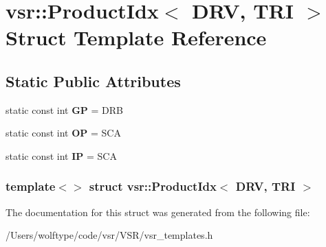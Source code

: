 \hypertarget{structvsr_1_1_product_idx_3_01_d_r_v_00_01_t_r_i_01_4}{\section{vsr\-:\-:Product\-Idx$<$ D\-R\-V, T\-R\-I $>$ Struct Template Reference}
\label{structvsr_1_1_product_idx_3_01_d_r_v_00_01_t_r_i_01_4}
}
\subsection*{Static Public Attributes}
\begin{DoxyCompactItemize}
\item 
\hypertarget{structvsr_1_1_product_idx_3_01_d_r_v_00_01_t_r_i_01_4_a6202c3e6985ae00ee4e6a09f51e10fc9}{static const int {\bfseries G\-P} = D\-R\-B}\label{structvsr_1_1_product_idx_3_01_d_r_v_00_01_t_r_i_01_4_a6202c3e6985ae00ee4e6a09f51e10fc9}

\item 
\hypertarget{structvsr_1_1_product_idx_3_01_d_r_v_00_01_t_r_i_01_4_a80e12ee7d52fe6a23a101f1d8c227a62}{static const int {\bfseries O\-P} = S\-C\-A}\label{structvsr_1_1_product_idx_3_01_d_r_v_00_01_t_r_i_01_4_a80e12ee7d52fe6a23a101f1d8c227a62}

\item 
\hypertarget{structvsr_1_1_product_idx_3_01_d_r_v_00_01_t_r_i_01_4_ac57b60d15399525ee09a2f4795cd77d2}{static const int {\bfseries I\-P} = S\-C\-A}\label{structvsr_1_1_product_idx_3_01_d_r_v_00_01_t_r_i_01_4_ac57b60d15399525ee09a2f4795cd77d2}

\end{DoxyCompactItemize}
\subsubsection*{template$<$$>$ struct vsr\-::\-Product\-Idx$<$ D\-R\-V, T\-R\-I $>$}



The documentation for this struct was generated from the following file\-:\begin{DoxyCompactItemize}
\item 
/\-Users/wolftype/code/vsr/\-V\-S\-R/vsr\-\_\-templates.\-h\end{DoxyCompactItemize}
